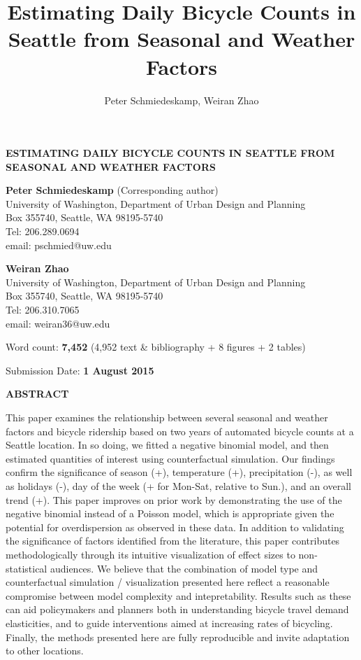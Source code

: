 \documentclass[12pt,letterpaper,article]{memoir}
\title{Estimating Daily Bicycle Counts in Seattle from Seasonal and Weather Factors}
\author{Peter Schmiedeskamp, Weiran Zhao}
\begin{document}
\thispagestyle{empty}

\par\noindent\textbf{ESTIMATING DAILY BICYCLE COUNTS IN SEATTLE FROM SEASONAL AND WEATHER FACTORS}

\vspace*{4pc}

\par\noindent\textbf{Peter Schmiedeskamp} (Corresponding author)\\
University of Washington, Department of Urban Design and Planning\\
Box 355740, Seattle, WA 98195-5740\\
Tel: 206.289.0694\\
email: pschmied@uw.edu

\vspace*{1.5pc}
\par\noindent\textbf{Weiran Zhao}\\
University of Washington, Department of Urban Design and Planning\\
Box 355740, Seattle, WA 98195-5740\\
Tel: 206.310.7065\\
email: weiran36@uw.edu

\vspace*{3pc}
\par\noindent Word count: \textbf{7,452} (4,952 text \& bibliography + 8 figures + 2 tables)

\vspace*{3pc}
\par\noindent Submission Date: \textbf{1 August 2015}

\clearpage

\par\noindent\textbf{ABSTRACT}

\par\noindent This paper examines the relationship between several seasonal and
weather factors and bicycle ridership based on two years of automated
bicycle counts at a Seattle location. In so doing, we fitted a
negative binomial model, and then estimated quantities of interest
using counterfactual simulation. Our findings confirm the significance
of season (+), temperature (+), precipitation (-), as well as holidays
(-), day of the week (+ for Mon-Sat, relative to Sun.), and an overall
trend (+). This paper improves on prior work by demonstrating the use
of the negative binomial instead of a Poisson model, which is
appropriate given the potential for overdispersion as observed in
these data. In addition to validating the significance of factors
identified from the literature, this paper contributes
methodologically through its intuitive visualization of effect sizes
to non-statistical audiences. We believe that the combination of model
type and counterfactual simulation / visualization presented here
reflect a reasonable compromise between model complexity and
intepretability. Results such as these can aid policymakers and
planners both in understanding bicycle travel demand elasticities, and
to guide interventions aimed at increasing rates of
bicycling. Finally, the methods presented here are fully reproducible
and invite adaptation to other locations.
\end{document}
